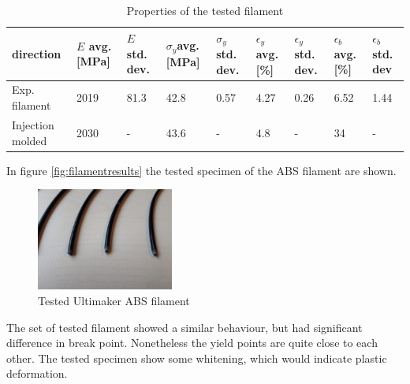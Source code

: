 
\begin{table}
\caption{Properties of the tested filament}
\begin{tabular}{ p{1.5cm}p{1cm}p{1cm}p{1cm}p{1cm}p{1cm}p{1cm}p{1cm}p{1cm}  }
 \hline
direction & $E$ avg. [MPa] & $E$ std. dev. & $\sigma_y$avg. [MPa] & $\sigma_y$ std. dev. & $\epsilon_y$ avg. [\%] & $\epsilon_y$   std. dev. & $\epsilon_b$ avg. [\%] & $\epsilon_b$   std. dev \\
 \hline
Exp. filament & 2019 & 81.3 & 42.8 & 0.57 & 4.27 & 0.26 & 6.52 & 1.44\\
Injection molded \cite{Ultimaker2018TechnicalABS} & 2030 & - & 43.6 & - & 4.8 & - & 34 & -\\
 \hline
\end{tabular}
     \label{tab:additionalresults}
 \end{table}

In figure \ref{fig:filamentresults} the tested specimen of the ABS filament are shown.
\begin{figure}[H]
    \centering
    \includegraphics[width=0.40\textwidth]{chapter_5_Experimentaltesting/figures/Imagefilament.jpg}
    \caption{Tested Ultimaker ABS filament}
    \label{fig:filamentspecimen}
\end{figure}
The set of tested filament showed a similar behaviour, but had significant difference in break point. Nonetheless the yield points are quite close to each other. The tested specimen show some whitening, which would indicate plastic deformation.  

